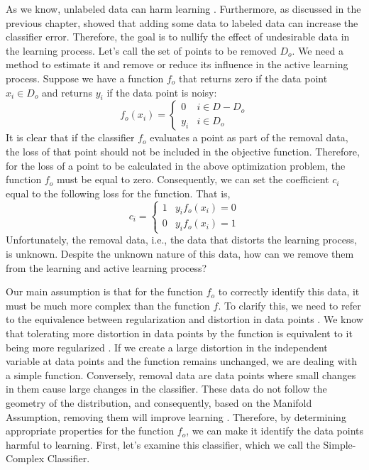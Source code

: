 \documentclass[12pt]{article}
\begin{document}
	As we know, unlabeled data can harm learning \cite{zhang2000training}. Furthermore, as discussed in the previous chapter, \cite{cohen2004red} showed that adding some data to labeled data can increase the classifier error. Therefore, the goal is to nullify the effect of undesirable data in the learning process. Let's call the set of points to be removed $D_o$. We need a method to estimate it and remove or reduce its influence in the active learning process. Suppose we have a function $f_o$ that returns zero if the data point $x_i \in D_o$ and returns $y_i$ if the data point is noisy:
	\begin{equation}
		f_o(x_i) = 
		\begin{cases}
			0 & i \in D - D_o \\
			y_i & i \in D_o
		\end{cases}
	\end{equation}
	It is clear that if the classifier $f_o$ evaluates a point as part of the removal data, the loss of that point should not be included in the objective function. Therefore, for the loss of a point to be calculated in the above optimization problem, the function $f_o$ must be equal to zero. Consequently, we can set the coefficient $c_i$ equal to the following loss for the function. That is,
	\begin{equation}
		c_i = 
		\begin{cases}
			1 & y_i f_o(x_i) = 0 \\
			0 & y_i f_o(x_i) = 1
		\end{cases}
	\end{equation}
	Unfortunately, the removal data, i.e., the data that distorts the learning process, is unknown. Despite the unknown nature of this data, how can we remove them from the learning and active learning process?
	
	Our main assumption is that for the function $f_o$ to correctly identify this data, it must be much more complex than the function $f$. To clarify this, we need to refer to the equivalence between regularization and distortion in data points \cite{xu2007regularization}. We know that tolerating more distortion in data points by the function is equivalent to it being more regularized \cite{xu2007regularization}. If we create a large distortion in the independent variable at data points and the function remains unchanged, we are dealing with a simple function. Conversely, removal data are data points where small changes in them cause large changes in the classifier. These data do not follow the geometry of the distribution, and consequently, based on the Manifold Assumption, removing them will improve learning \cite{belkin2006manifold}. Therefore, by determining appropriate properties for the function $f_o$, we can make it identify the data points harmful to learning. First, let's examine this classifier, which we call the Simple-Complex Classifier.
	
\end{document}
